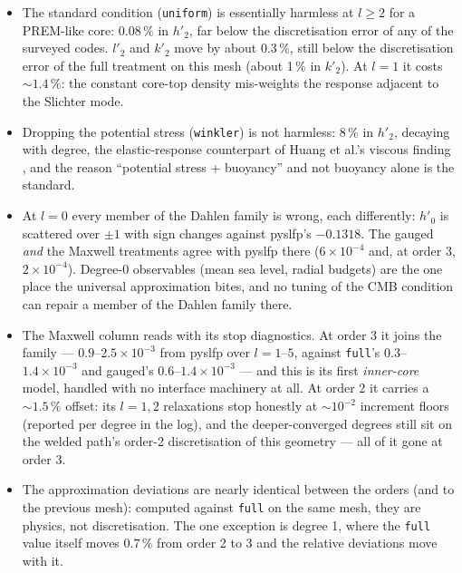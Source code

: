 \documentclass[11pt]{article}
\numberwithin{equation}{section}
\newcommand{\code}[1]{\texttt{#1}}
\begin{document}
\begin{itemize}[leftmargin=*]
\item The standard condition (\code{uniform}) is essentially harmless at
  $l\ge2$ for a PREM-like core: $0.08\,\%$ in $h'_2$, far below the
  discretisation error of any of the surveyed codes. $l'_2$ and $k'_2$
  move by about $0.3\,\%$, still below the discretisation error of the
  full treatment on this mesh (about 1\,\% in $k'_2$). At $l=1$ it costs
  $\sim1.4\,\%$: the constant core-top density mis-weights the response
  adjacent to the Slichter mode.
\item Dropping the potential stress (\code{winkler}) is not harmless: 8\,\%
  in $h'_2$, decaying with degree, the elastic-response counterpart of
  Huang et al.'s viscous finding \cite{Huang2023}, and the reason
  ``potential stress + buoyancy'' and not buoyancy alone is the standard.
\item At $l=0$ every member of the Dahlen family is wrong, each
  differently: $h'_0$ is scattered over $\pm1$ with sign changes against
  pyslfp's $-0.1318$. The gauged \emph{and} the Maxwell treatments agree with
  pyslfp there ($6\times10^{-4}$ and, at order 3, $2\times10^{-4}$).
  Degree-0 observables (mean sea level, radial
  budgets) are the one place the universal approximation bites, and no
  tuning of the CMB condition can repair a member of the Dahlen family
  there.
\item The Maxwell column reads with its stop diagnostics. At order 3 it
  joins the family --- $0.9$--$2.5\times10^{-3}$ from pyslfp over
  $l=1$--$5$, against \code{full}'s $0.3$--$1.4\times10^{-3}$ and
  gauged's $0.6$--$1.4\times10^{-3}$ --- and this is its first
  \emph{inner-core} model, handled with no interface machinery at all.
  At order 2 it carries a $\sim1.5\,\%$ offset: its $l=1,2$ relaxations
  stop honestly at $\sim10^{-2}$ increment floors (reported per degree
  in the log), and the deeper-converged degrees still sit on the welded
  path's order-2 discretisation of this geometry --- all of it gone at
  order 3.
\item The approximation deviations are nearly identical between the
  orders (and to the previous mesh): computed against \code{full} on
  the same mesh, they are physics, not discretisation. The one
  exception is degree 1, where the \code{full} value itself moves
  $0.7\,\%$ from order 2 to 3 and the relative deviations move with
  it.
\end{itemize}
\end{document}
